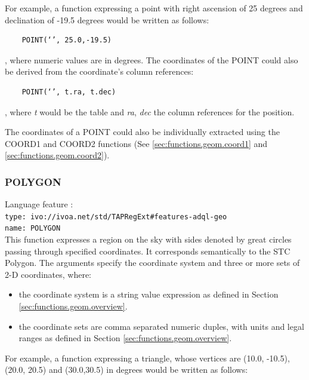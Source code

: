 \documentclass[11pt,a4paper]{ivoa}
\begin{document}
For example, a function expressing a point with right ascension of 25 degrees
and declination of -19.5 degrees would be written as follows:

\begin{verbatim}
    POINT(‘’, 25.0,-19.5)
\end{verbatim}

, where numeric values are in degrees. The coordinates of the POINT could
also be derived from the coordinate’s column references:

\begin{verbatim}
    POINT(‘’, t.ra, t.dec)
\end{verbatim}
    
, where \textit{t} would be the table and \textit{ra}, \textit{dec} the
column references for the position.

The coordinates of a POINT could also be individually extracted using the
COORD1 and COORD2 functions (See \ref{sec:functions.geom.coord1} and
\ref{sec:functions.geom.coord2}).

\subsubsection{POLYGON}
\label{sec:functions.geom.polygon}
{\footnotesize Language feature :}\\
{\footnotesize \verb|type: ivo://ivoa.net/std/TAPRegExt#features-adql-geo|}\\
{\footnotesize \verb|name: POLYGON|}\\

This function expresses a region on the sky with sides denoted by great
circles passing through specified coordinates. It corresponds semantically
to the STC Polygon. The arguments specify the
coordinate system and three or more sets of 2-D coordinates, where:

\begin{itemize}
    \item the coordinate system is a string value expression as defined in Section \ref{sec:functions.geom.overview}.
    \item the coordinate sets are comma separated numeric duples, with units and legal ranges as defined in Section \ref{sec:functions.geom.overview}.
\end{itemize}

For example, a function expressing a triangle, whose vertices are (10.0,
-10.5), (20.0, 20.5) and (30.0,30.5) in degrees would be written
as follows:
\end{document}
